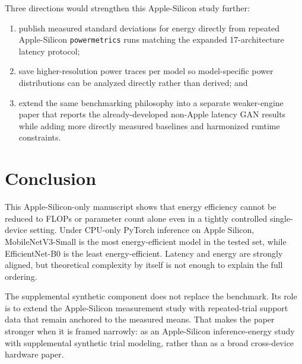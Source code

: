 \documentclass[11pt]{article}
\begin{document}
Three directions would strengthen this Apple-Silicon study further:
\begin{enumerate}
\item publish measured standard deviations for energy directly from repeated
Apple-Silicon \texttt{powermetrics} runs matching the expanded 17-architecture
latency protocol;
\item save higher-resolution power traces per model so model-specific power
distributions can be analyzed directly rather than derived; and
\item extend the same benchmarking philosophy into a separate weaker-engine paper
that reports the already-developed non-Apple latency GAN results while adding
more directly measured baselines and harmonized runtime constraints.
\end{enumerate}

\section{Conclusion}
This Apple-Silicon-only manuscript shows that energy efficiency cannot be
reduced to FLOPs or parameter count alone even in a tightly controlled
single-device setting. Under CPU-only PyTorch inference on Apple Silicon,
MobileNetV3-Small is the most energy-efficient model in the tested set, while
EfficientNet-B0 is the least energy-efficient. Latency and energy are strongly
aligned, but theoretical complexity by itself is not enough to explain the full
ordering.

The supplemental synthetic component does not replace the benchmark. Its role is
to extend the Apple-Silicon measurement study with repeated-trial support data
that remain anchored to the measured means. That makes the paper stronger when
it is framed narrowly: as an Apple-Silicon inference-energy study with
supplemental synthetic trial modeling, rather than as a broad cross-device
hardware paper.
\end{document}
